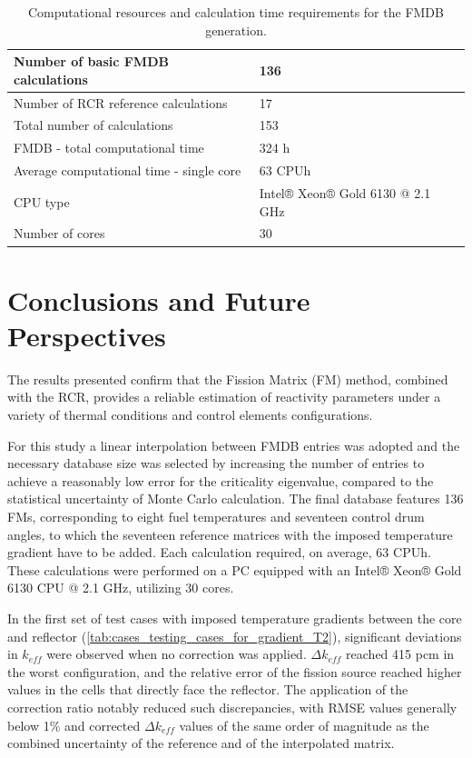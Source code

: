 \documentclass[preprint,review,12pt]{elsarticle}
\newif\ifhighlight
\newcommand{\rtwo}[1]{\ifhighlight\textcolor{revtwo}{#1}\else#1\fi}
\begin{document}
\begin{table}[h!]
\centering
\FloatBarrier
\caption{Computational resources and calculation time requirements for the FMDB generation.}
\label{tab:FMDBresources}
\begin{tabular}{ll}
\hline
Number of basic FMDB calculations       & 136                                      \\ \hline
Number of \rtwo{RCR} reference calculations              & 17                                       \\ \hline
Total number of calculations            & 153                                      \\ \hline
FMDB - total computational time         & 324 h                                    \\ \hline
Average computational time - single core & 63 CPUh                                  \\ \hline
CPU type                                & Intel® Xeon® Gold 6130 @ 2.1 GHz          \\ \hline
Number of cores                         & 30                                       \\ \hline
\end{tabular}
\end{table}

\section{Conclusions and Future Perspectives}

The results presented confirm that the Fission Matrix (FM) method, combined with the RCR, provides a reliable estimation of reactivity parameters under a variety of thermal conditions and control elements configurations.

For this study a linear interpolation between FMDB entries was adopted and the necessary database size was selected by increasing the number of entries to achieve a reasonably low error for the criticality eigenvalue, compared to the statistical uncertainty of Monte Carlo calculation. The final database features 136 FMs, corresponding to eight fuel temperatures and seventeen control drum angles, to which the seventeen reference matrices with the imposed temperature gradient have to be added. Each calculation required, on average, 63 CPUh. These calculations were performed on a PC equipped with an Intel® Xeon® Gold 6130 CPU @ 2.1 GHz, utilizing 30 cores. 
 
In the first set of test cases with imposed temperature gradients between the core and reflector (\cref{tab:cases_testing_cases_for_gradient_T2}), significant deviations in $k_{eff}$ were observed when no correction was applied. $\Delta k_{eff}$ reached 415 pcm in the worst configuration, and the relative error of the fission source reached higher values in the cells that directly face the reflector. The application of the correction ratio notably reduced such discrepancies, with RMSE values generally below 1\% and corrected $\Delta k_{eff}$ values of the same order of magnitude as the combined uncertainty of the reference and of the interpolated matrix.
\end{document}
